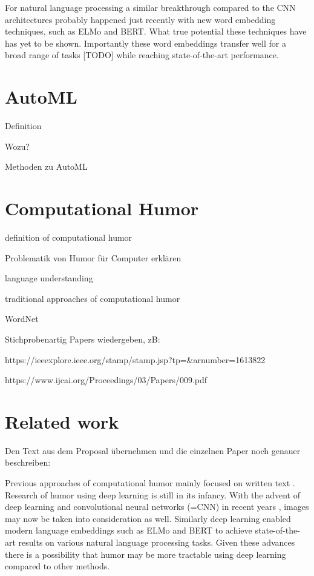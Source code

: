 \documentclass[draft,final,oneside]{vutinfth} %
\begin{document}
For natural language processing a similar breakthrough compared to the CNN architectures probably happened just recently with new word embedding techniques, such as ELMo and BERT. What true potential these techniques have has yet to be shown. Importantly these word embeddings transfer well for a broad range of tasks [TODO] while reaching state-of-the-art performance. 


\section{AutoML}
Definition

Wozu?

Methoden zu AutoML

\section{Computational Humor}
definition of computational humor

Problematik von Humor für Computer erklären

language understanding

traditional approaches of computational humor

WordNet 

Stichprobenartig Papers wiedergeben, zB: 

https://ieeexplore.ieee.org/stamp/stamp.jsp?tp=\&arnumber=1613822

https://www.ijcai.org/Proceedings/03/Papers/009.pdf

\section{Related work}

Den Text aus dem Proposal übernehmen und die einzelnen Paper noch genauer beschreiben:

Previous approaches of computational humor mainly focused on written text \cite{Yang2015HumorRA}\cite{Bamman2015ContextualizedSD}\cite{HumoristBot}. Research of humor using deep learning is still in its infancy. With the advent of deep learning and convolutional neural networks (=CNN) in recent years \cite{Druzhkov2016}, images may now be taken into consideration as well. Similarly deep learning enabled modern language embeddings such as ELMo \cite{elmo} and BERT \cite{bert} to achieve state-of-the-art results on various natural language processing tasks. Given these advances there is a possibility that humor may be more tractable using deep learning compared to other methods.
\end{document}
